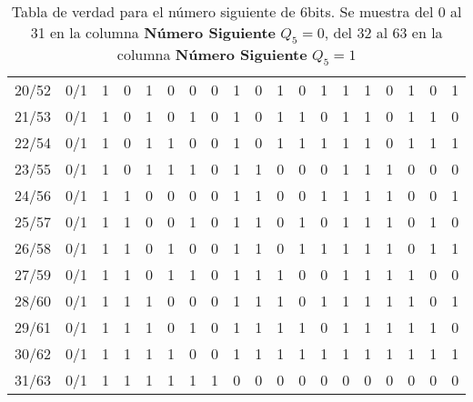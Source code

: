 \begin{table}[H]
\begin{adjustbox}{max width=\textwidth}
\begin{tabular}{ c | c | c | c | c | c | c ||| c | c | c | c | c | c || c | c | c | c | c | c }
      20/52 & 0/1 & 1 & 0 & 1 & 0 & 0 &   0 & 1 & 0 & 1 & 0 & 1 &   1 & 1 & 0 & 1 & 0 & 1 \\
      21/53 & 0/1 & 1 & 0 & 1 & 0 & 1 &   0 & 1 & 0 & 1 & 1 & 0 &   1 & 1 & 0 & 1 & 1 & 0 \\
      22/54 & 0/1 & 1 & 0 & 1 & 1 & 0 &   0 & 1 & 0 & 1 & 1 & 1 &   1 & 1 & 0 & 1 & 1 & 1 \\
      23/55 & 0/1 & 1 & 0 & 1 & 1 & 1 &   0 & 1 & 1 & 0 & 0 & 0 &   1 & 1 & 1 & 0 & 0 & 0 \\ \hline
      24/56 & 0/1 & 1 & 1 & 0 & 0 & 0 &   0 & 1 & 1 & 0 & 0 & 1 &   1 & 1 & 1 & 0 & 0 & 1 \\
      25/57 & 0/1 & 1 & 1 & 0 & 0 & 1 &   0 & 1 & 1 & 0 & 1 & 0 &   1 & 1 & 1 & 0 & 1 & 0 \\
      26/58 & 0/1 & 1 & 1 & 0 & 1 & 0 &   0 & 1 & 1 & 0 & 1 & 1 &   1 & 1 & 1 & 0 & 1 & 1 \\
      27/59 & 0/1 & 1 & 1 & 0 & 1 & 1 &   0 & 1 & 1 & 1 & 0 & 0 &   1 & 1 & 1 & 1 & 0 & 0 \\ \hline
      28/60 & 0/1 & 1 & 1 & 1 & 0 & 0 &   0 & 1 & 1 & 1 & 0 & 1 &   1 & 1 & 1 & 1 & 0 & 1 \\
      29/61 & 0/1 & 1 & 1 & 1 & 0 & 1 &   0 & 1 & 1 & 1 & 1 & 0 &   1 & 1 & 1 & 1 & 1 & 0 \\
      30/62 & 0/1 & 1 & 1 & 1 & 1 & 0 &   0 & 1 & 1 & 1 & 1 & 1 &   1 & 1 & 1 & 1 & 1 & 1 \\
      31/63 & 0/1 & 1 & 1 & 1 & 1 & 1 &   1 & 0 & 0 & 0 & 0 & 0 &   0 & 0 & 0 & 0 & 0 & 0 \\ \bottomrule
    \end{tabular}
  \end{adjustbox}
  \caption{Tabla de verdad para el número siguiente de 6bits. Se muestra del 0 al
  31 en la columna \textbf{Número Siguiente} \small{$Q_5=0$}, del 32 al 63 en la
  columna \textbf{Número Siguiente} \small{$Q_5=1$}}
\end{table}
